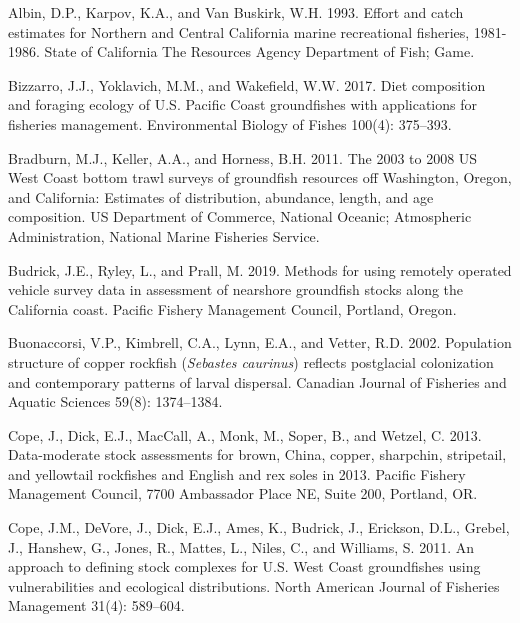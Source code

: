 \documentclass[11pt,
  english,
  a4paper,
]{article}
\newlength{\cslhangindent}
\newenvironment{CSLReferences}[2] %
 {%
  \setlength{\parindent}{0pt}
  \ifodd #1 \everypar{\setlength{\hangindent}{\cslhangindent}}\ignorespaces\fi
  \ifnum #2 > 0
  \setlength{\parskip}{#2\baselineskip}
  \fi
 }%
 {}
\begin{document}
\leavevmode\tagmcend\tagstructend


\hypertarget{refs}{}
\begin{CSLReferences}{1}{0}
\leavevmode{}%
Albin, D.P., Karpov, K.A., and Van Buskirk, W.H. 1993. Effort and catch estimates for {Northern} and {Central} {California} marine recreational fisheries, 1981-1986. State of California The Resources Agency Department of Fish; Game.

\leavevmode{}%
Bizzarro, J.J., Yoklavich, M.M., and Wakefield, W.W. 2017. Diet composition and foraging ecology of {U}.{S}. {Pacific} {Coast} groundfishes with applications for fisheries management. Environmental Biology of Fishes 100(4): 375--393.

\leavevmode{}%
Bradburn, M.J., Keller, A.A., and Horness, B.H. 2011. The 2003 to 2008 {US} {West} {Coast} bottom trawl surveys of groundfish resources off {Washington}, {Oregon}, and {California}: Estimates of distribution, abundance, length, and age composition. US Department of Commerce, National Oceanic; Atmospheric Administration, National Marine Fisheries Service.

\leavevmode{}%
Budrick, J.E., Ryley, L., and Prall, M. 2019. Methods for using remotely operated vehicle survey data in assessment of nearshore groundfish stocks along the {California} coast. Pacific Fishery Management Council, Portland, Oregon.

\leavevmode{}%
Buonaccorsi, V.P., Kimbrell, C.A., Lynn, E.A., and Vetter, R.D. 2002. Population structure of copper rockfish (\emph{{Sebastes} caurinus}) reflects postglacial colonization and contemporary patterns of larval dispersal. Canadian Journal of Fisheries and Aquatic Sciences 59(8): 1374--1384.

\leavevmode{}%
Cope, J., Dick, E.J., MacCall, A., Monk, M., Soper, B., and Wetzel, C. 2013. Data-moderate stock assessments for brown, {China}, copper, sharpchin, stripetail, and yellowtail rockfishes and {English} and rex soles in 2013. Pacific Fishery Management Council, 7700 Ambassador Place NE, Suite 200, Portland, OR.

\leavevmode{}%
Cope, J.M., DeVore, J., Dick, E.J., Ames, K., Budrick, J., Erickson, D.L., Grebel, J., Hanshew, G., Jones, R., Mattes, L., Niles, C., and Williams, S. 2011. An approach to defining stock complexes for {U}.{S}. {West} {Coast} groundfishes using vulnerabilities and ecological distributions. North American Journal of Fisheries Management 31(4): 589--604.


\end{CSLReferences}
\end{document}
